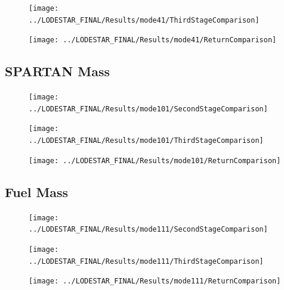 \begin{figure}[th]
\centering
\texttt{[image: ../LODESTAR\_FINAL/Results/mode41/ThirdStageComparison]}
\caption{}
\label{fig:ThirdStageComparison11}
\end{figure}

\begin{figure}[th]
\centering
\texttt{[image: ../LODESTAR\_FINAL/Results/mode41/ReturnComparison]}
\caption{}
\label{fig:ReturnComparison11}
\end{figure}


\subsection{SPARTAN Mass}

\begin{figure}[th]
\centering
\texttt{[image: ../LODESTAR\_FINAL/Results/mode101/SecondStageComparison]}
\caption{}
\label{fig:SecondStageComparison12}
\end{figure}

\begin{figure}[th]
\centering
\texttt{[image: ../LODESTAR\_FINAL/Results/mode101/ThirdStageComparison]}
\caption{}
\label{fig:ThirdStageComparison12}
\end{figure}

\begin{figure}[th]
\centering
\texttt{[image: ../LODESTAR\_FINAL/Results/mode101/ReturnComparison]}
\caption{}
\label{fig:ReturnComparison12}
\end{figure}


\subsection{Fuel Mass}

\begin{figure}[th]
\centering
\texttt{[image: ../LODESTAR\_FINAL/Results/mode111/SecondStageComparison]}
\caption{}
\label{fig:SecondStageComparison13}
\end{figure}

\begin{figure}[th]
\centering
\texttt{[image: ../LODESTAR\_FINAL/Results/mode111/ThirdStageComparison]}
\caption{}
\label{fig:ThirdStageComparison13}
\end{figure}

\begin{figure}[th]
\centering
\texttt{[image: ../LODESTAR\_FINAL/Results/mode111/ReturnComparison]}
\caption{}
\label{fig:ReturnComparison13}
\end{figure}



